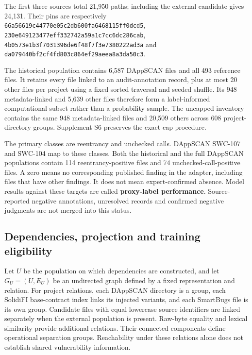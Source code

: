 \documentclass[preprint,12pt]{elsarticle}
\begin{document}
The first three sources total 21,950 paths; including the external candidate gives 24,131. Their pins are respectively \nolinkurl{66a56619c44770e05c2db600fa6468115ff0dcd5}, \nolinkurl{230e649123477eff332742a59a1c7cc6dc286cab}, \nolinkurl{4b0573e1b3f7031396de6f48f7f3e7380222ad3a} and \nolinkurl{da079440bf2cf4fd803c864ef29aeea8a3da50c3}.

The historical population contains 6,587 DAppSCAN files and all 493 reference files. It retains every file linked to an audit-annotation record, plus at most 20 other files per project using a fixed sorted traversal and seeded shuffle. Its 948 metadata-linked and 5,639 other files therefore form a label-informed computational subset rather than a probability sample. The uncapped inventory contains the same 948 metadata-linked files and 20,509 others across 608 project-directory groups. Supplement S6 preserves the exact cap procedure.

The primary classes are reentrancy and unchecked calls. DAppSCAN SWC-107 and SWC-104 map to these classes. Both the historical and the full DAppSCAN populations contain 114 reentrancy-positive files and 74 unchecked-call-positive files. A zero means no corresponding published finding in the adapter, including files that have other findings. It does not mean expert-confirmed absence. Model results against these targets are called \textbf{proxy-label performance}. Source-reported negative annotations, unresolved records and confirmed negative judgments are not merged into this status.

\subsection{Dependencies, projection and training eligibility}\label{dependencies-projection-and-training-eligibility}

Let \(U\) be the population on which dependencies are constructed, and let \(G_U=(U,E_U)\) be an undirected graph defined by a fixed representation and relation. For project relations, each DAppSCAN directory is a group, each SolidiFI base-contract index links its injected variants, and each SmartBugs file is its own group. Candidate files with equal lowercase source identifiers are linked separately when the external population is present. Raw-byte equality and lexical similarity provide additional relations. Their connected components define operational separation groups. Reachability under these relations alone does not establish shared vulnerability information.
\end{document}
